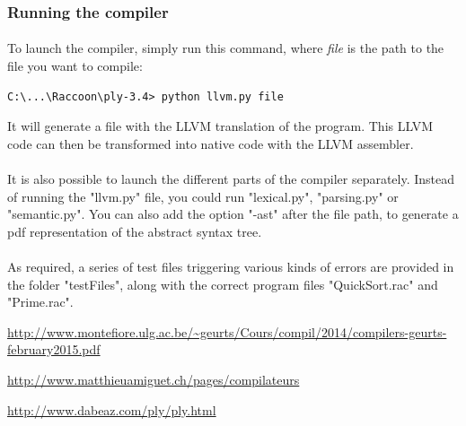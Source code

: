 \documentclass[12pt,a4paper]{article}
\begin{document}
\subsubsection{Running the compiler}
\paragraph{}
To launch the compiler, simply run this command, where \textit{file} is the path to the file you want to compile: 
\begin{verbatim}
C:\...\Raccoon\ply-3.4> python llvm.py file
\end{verbatim}
It will generate a file with the LLVM translation of the program. This LLVM code can then be transformed into native code with the LLVM assembler.

\paragraph{}
It is also possible to launch the different parts of the compiler separately. Instead of running the "llvm.py" file, you could run "lexical.py", "parsing.py" or "semantic.py". You can also add the option "-ast" after the file path, to generate a pdf representation of the abstract syntax tree.

\paragraph{}
As required, a series of test files triggering various kinds of errors are provided in the folder "testFiles", along with the correct program files "QuickSort.rac" and "Prime.rac".

\clearpage
\begin{thebibliography}{9}

\url{http://www.montefiore.ulg.ac.be/\~geurts/Cours/compil/2014/compilers-geurts-february2015.pdf}

\url{http://www.matthieuamiguet.ch/pages/compilateurs}

\url{http://www.dabeaz.com/ply/ply.html}


\end{thebibliography}
\end{document}
